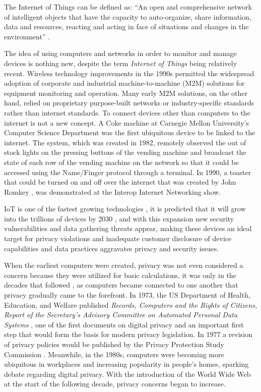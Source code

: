 The Internet of Things can be defined as: ``An open and comprehensive network
of intelligent objects that have the capacity to auto-organize, share information,
data and resources, reacting and acting in face of situations and changes
in the environment'' \cite{madakam2015internet}.

The idea of using computers and networks in order to monitor and manage
devices is nothing new, despite the term \textit{Internet of Things} being
relatively recent.
Wireless technology improvements in the 1990s permitted the widespread
adoption of corporate and industrial machine-to-machine (M2M) solutions
for equipment monitoring and operation. Many early M2M solutions, on the
other hand, relied on proprietary purpose-built networks or industry-specific
standards rather than internet standards. To connect devices other than
computers to the internet is not a new concept. A Coke machine at Carnegie
Mellon University's Computer Science Department \cite{EverhartInteresting}
was the first ubiquitous device to be linked to the internet. The system,
which was created in 1982, remotely observed the out of stock lights on
the pressing buttons of the vending machine and broadcast the state of each
row of the vending machine on the network so that it could be accessed using
the Name/Finger protocol through a terminal. In 1990, a toaster that could
be turned on and off over the internet that was created by John Romkey \cite{RomkeyToast},
was demonstrated at the Interop Internet Networking show.

IoT is one of the fastest growing technologies \cite{MohammadState}, it
is predicted that it will grow into the trillions of devices by 2030 \cite{SarawiInternet},
and with this expansion new security vulnerabilities and data gathering
threats appear, making these devices an ideal target for
privacy violations and inadequate customer disclosure of device capabilities
and data practices aggravates privacy and security issues.

When the earliest computers were created, privacy was not even considered
a concern because they were utilized for basic calculations, it was only in
the decades that followed \cite{hoffman1969computers}, as computers became connected to one another that privacy gradually came to
the forefront. In 1973, the US Department of Health, Education, and Welfare
published \textit{Records, Computers and the Rights of Citizens, Report of the
Secretary's Advisory Committee on Automated Personal Data Systems} \cite{hew1973records},
one of the first documents on digital privacy and an important first step that would
form the basis for modern privacy legislation. In 1977 a revision of privacy
policies would be published by the Privacy Protection Study Commission \cite{united1977personal}.
Meanwhile, in the 1980s, computers were becoming more ubiquitous in workplaces
and increasing popularity in people's homes, sparking debate regarding digital
privacy. With the introduction of the World Wide Web at the start of the following
decade, privacy concerns began to increase.

